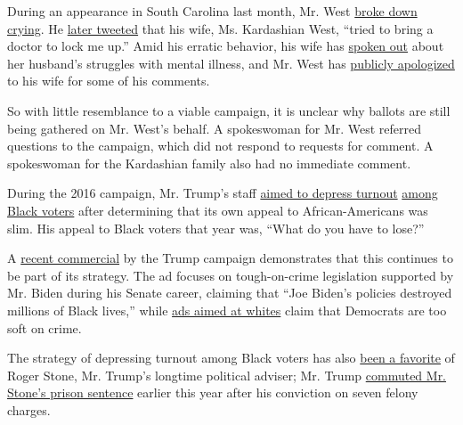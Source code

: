 During an appearance in South Carolina last month, Mr. West
\href{https://people.com/politics/kanye-west-first-campaign-rally-south-carolina/}{broke
down crying}. He
\href{https://pagesix.com/2020/07/20/kanye-west-says-kim-kardashian-tried-to-lock-me-up-in-twitter-rant/}{later
tweeted} that his wife, Ms. Kardashian West, ``tried to bring a doctor
to lock me up.'' Amid his erratic behavior, his wife has
\href{https://www.cnn.com/2020/07/22/entertainment/kim-kardashian-kanye-west-mental-health-statement/index.html}{spoken
out} about her husband's struggles with mental illness, and Mr. West has
\href{https://twitter.com/kanyewest/status/1287128322959237120}{publicly
apologized} to his wife for some of his comments.

So with little resemblance to a viable campaign, it is unclear why
ballots are still being gathered on Mr. West's behalf. A spokeswoman for
Mr. West referred questions to the campaign, which did not respond to
requests for comment. A spokeswoman for the Kardashian family also had
no immediate comment.

During the 2016 campaign, Mr. Trump's staff
\href{https://www.nytimes.com/2016/10/28/us/politics/donald-trump-campaign-voter-suppression.html}{aimed
to depress turnout}
\href{https://www.theatlantic.com/politics/archive/2016/10/trumps-black-voter-dilemma/505586/}{among
Black voters} after determining that its own appeal to African-Americans
was slim. His appeal to Black voters that year was, ``What do you have
to lose?''

A
\href{https://host2.advertisinganalyticsllc.com/admo/viewer/2343047}{recent
commercial} by the Trump campaign demonstrates that this continues to be
part of its strategy. The ad focuses on tough-on-crime legislation
supported by Mr. Biden during his Senate career, claiming that ``Joe
Biden's policies destroyed millions of Black lives,'' while
\href{https://www.bloomberg.com/news/articles/2020-07-27/trump-tailors-conflicting-ads-to-blacks-whites-on-biden-record}{ads
aimed at whites} claim that Democrats are too soft on crime.

The strategy of depressing turnout among Black voters has also
\href{https://theintercept.com/2017/03/06/facts-are-in-the-eye-of-the-beholder-says-roger-stone-trump-confidante-in-exclusive-interview/}{been
a favorite} of Roger Stone, Mr. Trump's longtime political adviser; Mr.
Trump
\href{https://www.nytimes.com/2020/07/10/us/politics/trump-roger-stone-clemency.html}{commuted
Mr. Stone's prison sentence} earlier this year after his conviction on
seven felony charges.

